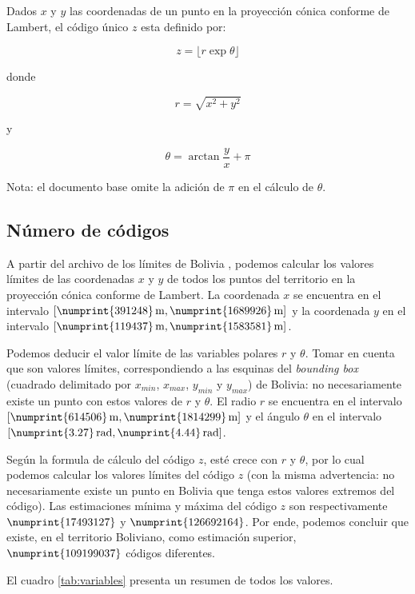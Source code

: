 \documentclass[letterpaper]{article}
\begin{document}
Dados \(x\) y \(y\) las coordenadas de un punto en la proyección cónica conforme de Lambert, el código único \(z\) esta definido por:

\[z = \lfloor r \exp{\theta} \rfloor\]

donde

\[r = \sqrt{x^2+y^2} \]

y

\[\theta = \arctan{\frac{y}{x}} + \pi \]

Nota: el documento base omite la adición de \(\pi\) en el cálculo de \(\theta\).

\subsection{Número de códigos}

A partir del archivo de los límites de Bolivia \cite{datos:limites_bolivia}, podemos calcular los valores límites de las coordenadas \(x\) y \(y\) de todos los puntos del territorio en la proyección cónica conforme de Lambert. La coordenada \(x\) se encuentra en el intervalo \([\numprint{391248}\,\mathrm{m}, \numprint{1689926}\,\mathrm{m}]\) y la coordenada \(y\) en el intervalo \([\numprint{119437}\,\mathrm{m}, \numprint{1583581}\,\mathrm{m}]\).

Podemos deducir el valor límite de las variables polares \(r\) y \(\theta\). Tomar en cuenta que son valores límites, correspondiendo a las esquinas del \emph{bounding box} (cuadrado delimitado por \(x_{min}\), \(x_{max}\), \(y_{min}\) y \(y_{max}\)) de Bolivia: no necesariamente existe un punto con estos valores de \(r\) y \(\theta\). El radio \(r\) se encuentra en el intervalo \([\numprint{614506}\,\mathrm{m}, \numprint{1814299}\,\mathrm{m}]\) y el ángulo \(\theta\) en el intervalo \([\numprint{3.27}\,\mathrm{rad}, \numprint{4.44}\,\mathrm{rad}]\).

Según la formula de cálculo del código \(z\), esté crece con \(r\) y \(\theta\), por lo cual podemos calcular los valores límites del código \(z\) (con la misma advertencia: no necesariamente existe un punto en Bolivia que tenga estos valores extremos del código). Las estimaciones mínima y máxima del código \(z\) son respectivamente \(\numprint{17493127}\) y \(\numprint{126692164}\). Por ende, podemos concluir que existe, en el territorio Boliviano, como estimación superior, \(\numprint{109199037}\) códigos diferentes.

El cuadro \ref{tab:variables} presenta un resumen de todos los valores.
\end{document}
